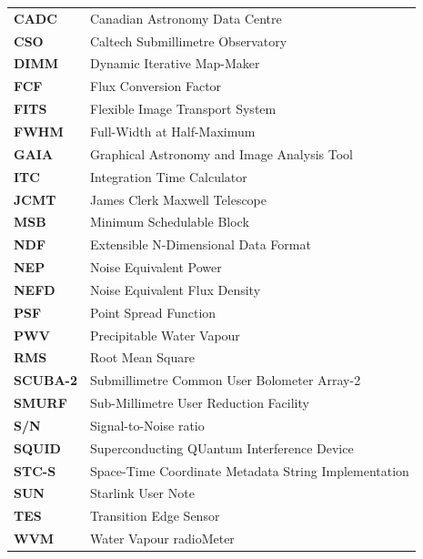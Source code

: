 \documentclass[11pt,oneside,chapters]{starlink}
\begin{document}
\scfrontmatter

\Acronyms

\begin{table}[h!]
\begin{tabular}{ll}
\textbf{CADC}   & Canadian Astronomy Data Centre\\
\textbf{CSO}    & Caltech Submillimetre Observatory\\
\textbf{DIMM}   & Dynamic Iterative Map-Maker\\
\textbf{FCF}    & Flux Conversion Factor\\
\textbf{FITS}   & Flexible Image Transport System\\
\textbf{FWHM}   & Full-Width at Half-Maximum\\
\textbf{GAIA}   & Graphical Astronomy and Image Analysis Tool\\
\textbf{ITC}    & Integration Time Calculator\\
\textbf{JCMT}   & James Clerk Maxwell Telescope\\
\textbf{MSB}    & Minimum Schedulable Block\\
\textbf{NDF}    & Extensible N-Dimensional Data Format\\
\textbf{NEP}    & Noise Equivalent Power\\
\textbf{NEFD}   & Noise Equivalent Flux Density\\
\textbf{PSF}    & Point Spread Function\\
\textbf{PWV}    & Precipitable Water Vapour\\
\textbf{RMS}    & Root Mean Square\\
\textbf{SCUBA-2}& Submillimetre Common User Bolometer Array-2\\
\textbf{SMURF}  & Sub-Millimetre User Reduction Facility\\
\textbf{S/N}    & Signal-to-Noise ratio\\
\textbf{SQUID}  & Superconducting QUantum Interference Device\\
\textbf{STC-S}  & Space-Time Coordinate Metadata String Implementation\\
\textbf{SUN}    & Starlink User Note\\
\textbf{TES}    & Transition Edge Sensor\\
\textbf{WVM}    & Water Vapour radioMeter\\
\end{tabular}
\end{table}
\end{document}

